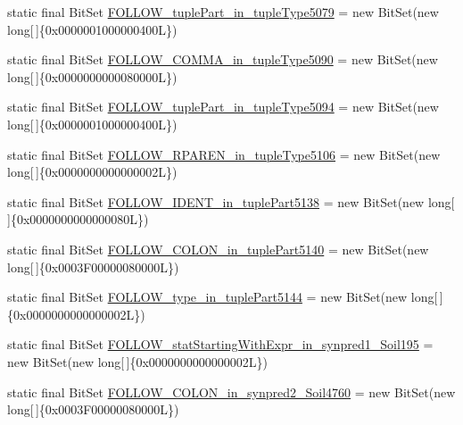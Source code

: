 \begin{DoxyCompactItemize}
\item 
static final Bit\-Set \hyperlink{classorg_1_1tzi_1_1use_1_1parser_1_1soil_1_1_soil_parser_a65790843d5249b48e66e803f6a0ba830}{F\-O\-L\-L\-O\-W\-\_\-tuple\-Part\-\_\-in\-\_\-tuple\-Type5079} = new Bit\-Set(new long\mbox{[}$\,$\mbox{]}\{0x0000001000000400\-L\})
\item 
static final Bit\-Set \hyperlink{classorg_1_1tzi_1_1use_1_1parser_1_1soil_1_1_soil_parser_a4882a8bae4a84882e7c8d3f5ad00cf3c}{F\-O\-L\-L\-O\-W\-\_\-\-C\-O\-M\-M\-A\-\_\-in\-\_\-tuple\-Type5090} = new Bit\-Set(new long\mbox{[}$\,$\mbox{]}\{0x0000000000080000\-L\})
\item 
static final Bit\-Set \hyperlink{classorg_1_1tzi_1_1use_1_1parser_1_1soil_1_1_soil_parser_a46eac6cbe455d659cf9ca0271b9b9674}{F\-O\-L\-L\-O\-W\-\_\-tuple\-Part\-\_\-in\-\_\-tuple\-Type5094} = new Bit\-Set(new long\mbox{[}$\,$\mbox{]}\{0x0000001000000400\-L\})
\item 
static final Bit\-Set \hyperlink{classorg_1_1tzi_1_1use_1_1parser_1_1soil_1_1_soil_parser_a8ed07a596aa61b74dd5e3666216d7b70}{F\-O\-L\-L\-O\-W\-\_\-\-R\-P\-A\-R\-E\-N\-\_\-in\-\_\-tuple\-Type5106} = new Bit\-Set(new long\mbox{[}$\,$\mbox{]}\{0x0000000000000002\-L\})
\item 
static final Bit\-Set \hyperlink{classorg_1_1tzi_1_1use_1_1parser_1_1soil_1_1_soil_parser_acba75ca116472cefd38d49575544e16c}{F\-O\-L\-L\-O\-W\-\_\-\-I\-D\-E\-N\-T\-\_\-in\-\_\-tuple\-Part5138} = new Bit\-Set(new long\mbox{[}$\,$\mbox{]}\{0x0000000000000080\-L\})
\item 
static final Bit\-Set \hyperlink{classorg_1_1tzi_1_1use_1_1parser_1_1soil_1_1_soil_parser_af2c37efba375140b6932787b138bd773}{F\-O\-L\-L\-O\-W\-\_\-\-C\-O\-L\-O\-N\-\_\-in\-\_\-tuple\-Part5140} = new Bit\-Set(new long\mbox{[}$\,$\mbox{]}\{0x0003\-F00000080000\-L\})
\item 
static final Bit\-Set \hyperlink{classorg_1_1tzi_1_1use_1_1parser_1_1soil_1_1_soil_parser_a27fa85c53a0449eddf441c2cf353df46}{F\-O\-L\-L\-O\-W\-\_\-type\-\_\-in\-\_\-tuple\-Part5144} = new Bit\-Set(new long\mbox{[}$\,$\mbox{]}\{0x0000000000000002\-L\})
\item 
static final Bit\-Set \hyperlink{classorg_1_1tzi_1_1use_1_1parser_1_1soil_1_1_soil_parser_a30dea245dbc31a9efed8e51735ca937c}{F\-O\-L\-L\-O\-W\-\_\-stat\-Starting\-With\-Expr\-\_\-in\-\_\-synpred1\-\_\-\-Soil195} = new Bit\-Set(new long\mbox{[}$\,$\mbox{]}\{0x0000000000000002\-L\})
\item 
static final Bit\-Set \hyperlink{classorg_1_1tzi_1_1use_1_1parser_1_1soil_1_1_soil_parser_a52b71bcd667c8d2574acb3668d932722}{F\-O\-L\-L\-O\-W\-\_\-\-C\-O\-L\-O\-N\-\_\-in\-\_\-synpred2\-\_\-\-Soil4760} = new Bit\-Set(new long\mbox{[}$\,$\mbox{]}\{0x0003\-F00000080000\-L\})

\end{DoxyCompactItemize}
